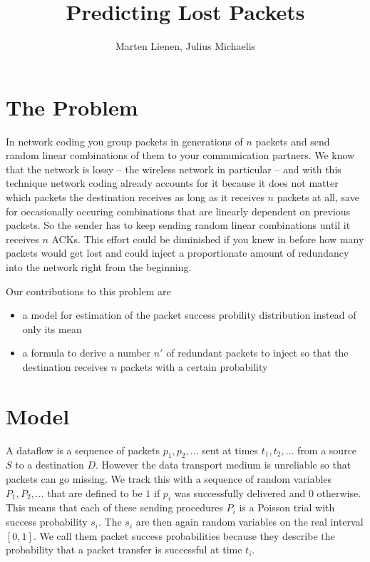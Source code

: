 \documentclass[10pt,a4paper]{article}
\title{Predicting Lost Packets}
\author{Marten Lienen, Julius Michaelis}
\begin{document}
\maketitle

\section{The Problem}

In network coding you group packets in generations of $n$ packets and send random linear combinations of them to your communication partners.
We know that the network is lossy -- the wireless network in particular -- and with this technique network coding already accounts for it because it does not matter which packets the destination receives as long as it receives $n$ packets at all, save for occasionally occuring combinations that are linearly dependent on previous packets.
So the sender has to keep sending random linear combinations until it receives $n$ ACKs.
This effort could be diminished if you knew in before how many packets would get lost and could inject a proportionate amount of redundancy into the network right from the beginning.

Our contributions to this problem are
\begin{itemize}
\item a model for estimation of the packet success probility distribution instead of only its mean
\item a formula to derive a number $n'$ of redundant packets to inject so that the destination receives $n$ packets with a certain probability
\end{itemize}

\section{Model}\label{sec:model}

A dataflow is a sequence of packets $p_{1}, p_{2}, \dots$ sent at times $t_{1}, t_{2}, \dots$ from a source $S$ to a destination $D$.
However the data transport medium is unreliable so that packets can go missing.
We track this with a sequence of random variables $P_{1}, P_{2}, \dots$ that are defined to be $1$ if $p_{i}$ was successfully delivered and $0$ otherwise.
This means that each of these sending procedures $P_{i}$ is a Poisson trial with success probability $s_{i}$.
The $s_{i}$ are then again random variables on the real interval $[0, 1]$.
We call them packet success probabilities because they describe the probability that a packet transfer is successful at time $t_{i}$.
\end{document}
